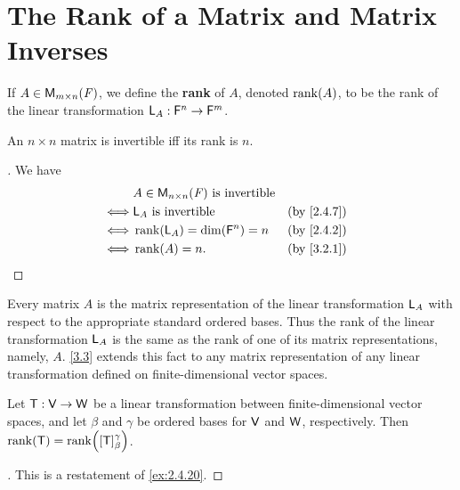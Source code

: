 \section{The Rank of a Matrix and Matrix Inverses}\label{sec:3.2}

\begin{defn}\label{3.2.1}
  If \(A \in \mathsf{M}_{{m} \times n}({\mathit{F}})\), we define the \textbf{rank} of \(A\), denoted \(\rk{A}\), to be the rank of the linear transformation \(\mathsf{L}_A : \mathsf{F}^n \to \mathsf{F}^m\).
\end{defn}

\begin{cor}\label{3.2.2}
  An \(n \times n\) matrix is invertible iff its rank is \(n\).
\end{cor}

\begin{proof}[]
  We have
  \begin{align*}
         & A \in \ms{n}{n}{\F} \text{ is invertible}                               \\
    \iff & \L_A \text{ is invertible}                &  & \text{(by \cref{2.4.7})} \\
    \iff & \rk{\L_A} = \dim(\vs{F}^n) = n            &  & \text{(by \cref{2.4.2})} \\
    \iff & \rk{A} = n.                               &  & \text{(by \cref{3.2.1})}
  \end{align*}
\end{proof}

\begin{note}
  Every matrix \(A\) is the matrix representation of the linear transformation \(\mathsf{L}_A\) with respect to the appropriate standard ordered bases.
  Thus the rank of the linear transformation \(\mathsf{L}_A\) is the same as the rank of one of its matrix representations, namely, \(A\).
  \cref{3.3} extends this fact to any matrix representation of any linear transformation defined on finite-dimensional vector spaces.
\end{note}

\begin{thm}\label{3.3}
  Let \(\mathsf{T} : \mathsf{V} \to \mathsf{W}\) be a linear transformation between finite-dimensional vector spaces, and let \(\beta\) and \(\gamma\) be ordered bases for \(\mathsf{V}\) and \(\mathsf{W}\), respectively.
  Then \(\rk{\T} = \rk{[\T]_{\beta}^{\gamma}}\).
\end{thm}

\begin{proof}[]
  This is a restatement of \cref{ex:2.4.20}.
\end{proof}

